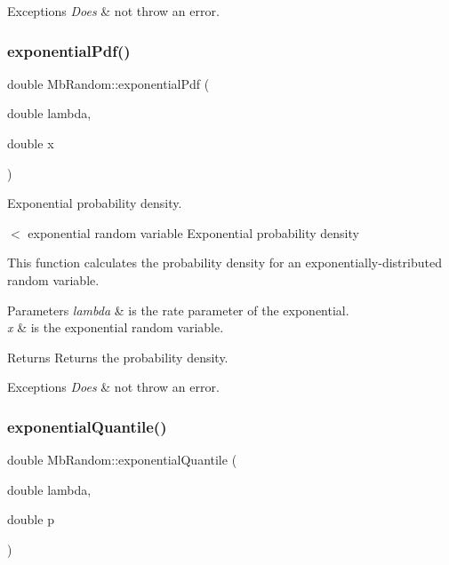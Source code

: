 \begin{DoxyExceptions}{Exceptions}
{\em Does} & not throw an error. \\
\hline
\end{DoxyExceptions}
\mbox{\label{class_mb_random_a3a9018e4866bd9c61b0e8bc28c2f177e}} 
\subsubsection{\texorpdfstring{exponentialPdf()}{exponentialPdf()}}
{\footnotesize\ttfamily double Mb\+Random\+::exponential\+Pdf (\begin{DoxyParamCaption}\item[{double}]{lambda,  }\item[{double}]{x }\end{DoxyParamCaption})\hspace{0.3cm}{\ttfamily [inline]}}



Exponential probability density. 

$<$ exponential random variable Exponential probability density

This function calculates the probability density for an exponentially-\/distributed random variable.


\begin{DoxyParams}{Parameters}
{\em lambda} & is the rate parameter of the exponential. \\
\hline
{\em x} & is the exponential random variable. \\
\hline
\end{DoxyParams}
\begin{DoxyReturn}{Returns}
Returns the probability density. 
\end{DoxyReturn}

\begin{DoxyExceptions}{Exceptions}
{\em Does} & not throw an error. \\
\hline
\end{DoxyExceptions}
\mbox{\label{class_mb_random_a329f440ae9e26adca8cbdd42acd2d480}} 
\subsubsection{\texorpdfstring{exponentialQuantile()}{exponentialQuantile()}}
{\footnotesize\ttfamily double Mb\+Random\+::exponential\+Quantile (\begin{DoxyParamCaption}\item[{double}]{lambda,  }\item[{double}]{p }\end{DoxyParamCaption})\hspace{0.3cm}{\ttfamily [inline]}}




